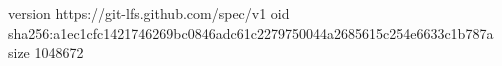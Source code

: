 version https://git-lfs.github.com/spec/v1
oid sha256:a1ec1cfc1421746269bc0846adc61c2279750044a2685615c254e6633c1b787a
size 1048672
